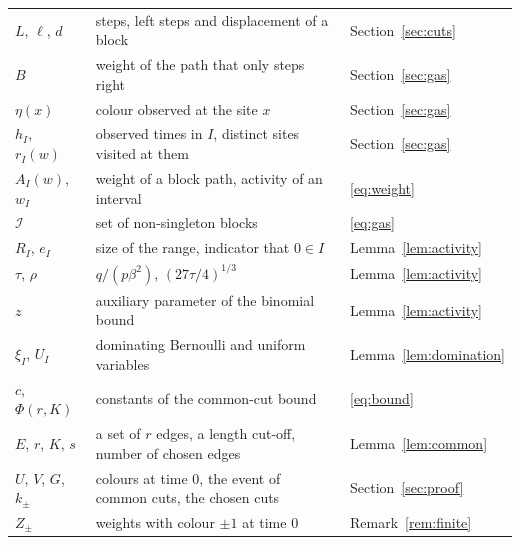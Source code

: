 \documentclass[11pt]{amsart}
\theoremstyle{remark}
\begin{document}
\begin{center}
\begin{tabular}{p{3.0cm}p{8.0cm}p{3.1cm}}
$L$, $\ell$, $d$ & steps, left steps and displacement of a block & Section~\ref{sec:cuts}\\
$B$ & weight of the path that only steps right & Section~\ref{sec:gas}\\
$\eta(x)$ & colour observed at the site $x$ & Section~\ref{sec:gas}\\
$h_I$, $r_I(w)$ & observed times in $I$, distinct sites visited at them & Section~\ref{sec:gas}\\
$A_I(w)$, $w_I$ & weight of a block path, activity of an interval & \eqref{eq:weight}\\
$\mathcal I$ & set of non-singleton blocks & \eqref{eq:gas}\\
$R_I$, $e_I$ & size of the range, indicator that $0\in I$ & Lemma~\ref{lem:activity}\\
$\tau$, $\rho$ & $q/(p\beta^2)$, $(27\tau/4)^{1/3}$ & Lemma~\ref{lem:activity}\\
$z$ & auxiliary parameter of the binomial bound & Lemma~\ref{lem:activity}\\
$\xi_I$, $U_I$ & dominating Bernoulli and uniform variables & Lemma~\ref{lem:domination}\\
$c$, $\Phi(r,K)$ & constants of the common-cut bound & \eqref{eq:bound}\\
$E$, $r$, $K$, $s$ & a set of $r$ edges, a length cut-off, number of chosen edges & Lemma~\ref{lem:common}\\
$U$, $V$, $G$, $k_\pm$ & colours at time $0$, the event of common cuts, the chosen cuts & Section~\ref{sec:proof}\\
$Z_\pm$ & weights with colour $\pm1$ at time $0$ & Remark~\ref{rem:finite}\\
\bottomrule
\end{tabular}
\end{center}
\end{document}
